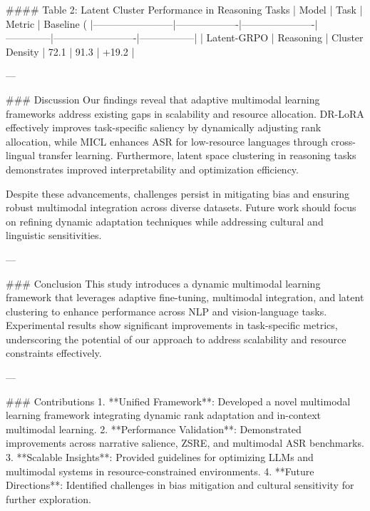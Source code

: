 #### Table 2: Latent Cluster Performance in Reasoning Tasks
| Model                  | Task              | Metric               | Baseline (%
|------------------------|-------------------|----------------------|--------------|-------------------------|-----------------|
| Latent-GRPO           | Reasoning         | Cluster Density      | 72.1         | 91.3                    | +19.2           |

---

### Discussion
Our findings reveal that adaptive multimodal learning frameworks address existing gaps in scalability and resource allocation. DR-LoRA effectively improves task-specific saliency by dynamically adjusting rank allocation, while MICL enhances ASR for low-resource languages through cross-lingual transfer learning. Furthermore, latent space clustering in reasoning tasks demonstrates improved interpretability and optimization efficiency.

Despite these advancements, challenges persist in mitigating bias and ensuring robust multimodal integration across diverse datasets. Future work should focus on refining dynamic adaptation techniques while addressing cultural and linguistic sensitivities.

---

### Conclusion
This study introduces a dynamic multimodal learning framework that leverages adaptive fine-tuning, multimodal integration, and latent clustering to enhance performance across NLP and vision-language tasks. Experimental results show significant improvements in task-specific metrics, underscoring the potential of our approach to address scalability and resource constraints effectively.

---

### Contributions
1. **Unified Framework**: Developed a novel multimodal learning framework integrating dynamic rank adaptation and in-context multimodal learning.
2. **Performance Validation**: Demonstrated improvements across narrative salience, ZSRE, and multimodal ASR benchmarks.
3. **Scalable Insights**: Provided guidelines for optimizing LLMs and multimodal systems in resource-constrained environments.
4. **Future Directions**: Identified challenges in bias mitigation and cultural sensitivity for further exploration.